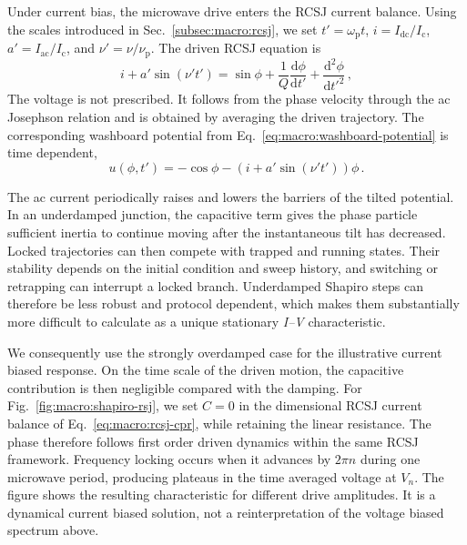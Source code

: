             Under current bias, the microwave drive enters the RCSJ current balance. Using the scales introduced in Sec.~\ref{subsec:macro:rcsj}, we set $t'=\omega_\mathrm{p}t$, $i=I_\mathrm{dc}/I_\mathrm{c}$, $a'=I_\mathrm{ac}/I_\mathrm{c}$, and $\nu'=\nu/\nu_\mathrm{p}$. The driven RCSJ equation is
            \begin{equation}
                i+a'\sin(\nu't')
                =\sin\phi
                +\frac{1}{Q}\frac{\mathrm{d}\phi}{\mathrm{d}t'}
                +\frac{\mathrm{d}^2\phi}{\mathrm{d}t'^2}\,,
                \label{eq:macro:shapiro-rcsj}
            \end{equation}
            The voltage is not prescribed. It follows from the phase velocity through the ac Josephson relation and is obtained by averaging the driven trajectory. The corresponding washboard potential from Eq.~\eqref{eq:macro:washboard-potential} is time dependent,
            \begin{equation}
                u(\phi,t')
                =-\cos\phi-\left(i+a'\sin(\nu't')\right)\phi\,.
                \label{eq:macro:shapiro-washboard}
            \end{equation}

            The ac current periodically raises and lowers the barriers of the tilted potential. In an underdamped junction, the capacitive term gives the phase particle sufficient inertia to continue moving after the instantaneous tilt has decreased. Locked trajectories can then compete with trapped and running states. Their stability depends on the initial condition and sweep history, and switching or retrapping can interrupt a locked branch. Underdamped Shapiro steps can therefore be less robust and protocol dependent, which makes them substantially more difficult to calculate as a unique stationary \textit{I--V} characteristic.

            We consequently use the strongly overdamped case for the illustrative current biased response. On the time scale of the driven motion, the capacitive contribution is then negligible compared with the damping. For Fig.~\ref{fig:macro:shapiro-rsj}, we set $C=0$ in the dimensional RCSJ current balance of Eq.~\eqref{eq:macro:rcsj-cpr}, while retaining the linear resistance. The phase therefore follows first order driven dynamics within the same RCSJ framework. Frequency locking occurs when it advances by $2\pi n$ during one microwave period, producing plateaus in the time averaged voltage at $V_n$. The figure shows the resulting characteristic for different drive amplitudes. It is a dynamical current biased solution, not a reinterpretation of the voltage biased spectrum above.
